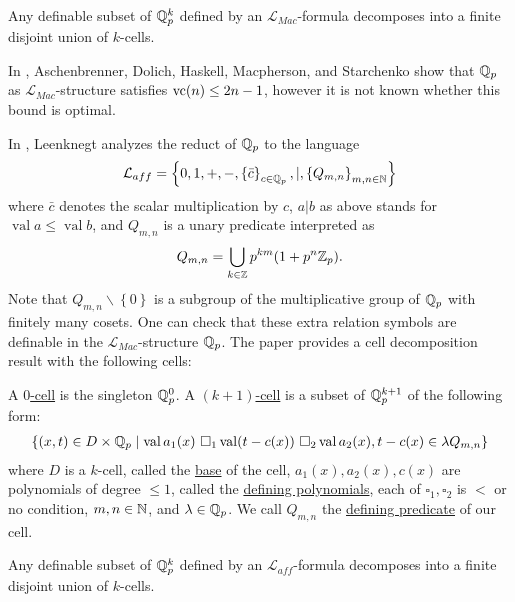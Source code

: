 \documentclass{amsart}
\renewcommand{\LL}{\mathcal L}
\newcommand{\LLM}{\mathcal L_{Mac}}
\newcommand{\curly}[1]{\left\{#1\right\}}
\DeclareMathOperator{\vval}{val}
\newcommand{\defn}{\ul}
\begin{document}
\begin{Theorem} 
  Any definable subset of $\mathbb{Q}_p^k$ defined by an $\LLM$-formula decomposes into a finite disjoint union of $k$-cells.
\end{Theorem}  

In \cite{density}, Aschenbrenner, Dolich, Haskell, Macpherson, and Starchenko show that $\mathbb{Q}_p$ as $\LLM$-structure satisfies $\operatorname{vc}(n) \leq 2n - 1$,
however it is not known whether this bound is optimal.

In \cite{reduct}, Leenknegt analyzes the reduct of $\mathbb{Q}_p$ to the language
\begin{align*}
  \LL_{aff}  = \curly{0, 1, +, -, \curly{\bar c}_{c \in \Q_p}, |, \curly{Q_{m,n}}_{m,n\in \N}}
\end{align*}
where $\bar c$ denotes the scalar multiplication by $c$,
$a | b$ as above stands for $\vval a \leq \vval b$,
and $Q_{m,n}$ is a unary predicate interpreted as
\begin{align*}
  Q_{m,n} = \bigcup_{k \in \mathbb{Z}} p^{km} (1 + p^n\mathbb{Z}_p).
\end{align*}
Note that $Q_{m,n} \backslash \curly{0}$ is a subgroup of the multiplicative group of $\mathbb{Q}_p$ with finitely many cosets.
One can check that these extra relation symbols are definable in the $\LLM$-structure $\mathbb{Q}_p$.
The paper \cite{reduct} provides a cell decomposition result with the following cells:

\begin{Definition} \label{cell}
  A \defn{$0$-cell} is the singleton $\mathbb{Q}_p^0$.
  A \defn{$(k+1)$-cell} is a subset of $\mathbb{Q}_p^{k+1}$ of the following form:
  \begin{align*}
    \curly{(x, t) \in D \times \Q_p \mid \vval a_1(x) \ \square_1 \vval (t - c(x)) \ \square_2 \vval a_2(x), t - c(x) \in \lambda Q_{m,n} }
  \end{align*}
  where $D$ is a $k$-cell, called the \defn{base} of the cell,
  $a_1(x), a_2(x), c(x)$ are polynomials of degree $\leq 1$, called the \defn{defining polynomials},
  each of $\square_1, \square_2$ is $<$ or no condition,
  $m,n \in \mathbb{N}$,
  and
  $\lambda  \in\mathbb{Q}_p$.
  We call $Q_{m,n}$ the \defn{defining predicate} of our cell.
\end{Definition}

\begin{Theorem}[Leenknegt '12] \label{leen}
  Any definable subset of $\mathbb{Q}_p^k$ defined by an $\LL_{aff}$-formula decomposes into a finite disjoint union of $k$-cells.
\end{Theorem}  
\end{document}
